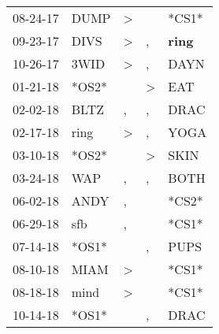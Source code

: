 \begin{supertabular}{p{0.07\textwidth}p{0.06\textwidth}p{0.02\textwidth}p{0.02\textwidth}p{0.06\textwidth}}
          08-24-17\textsuperscript{} &           DUMP\textsuperscript{} &     \textgreater &                  &                            *CS1* \\
          09-23-17\textsuperscript{} &           DIVS\textsuperscript{} &     \textgreater &                , &  \textbf{ring\textsuperscript{}} \\
          10-26-17\textsuperscript{} &           3WID\textsuperscript{} &     \textgreater &                , &           DAYN\textsuperscript{} \\
          01-21-18\textsuperscript{} &                            *OS2* &                  &     \textgreater &            EAT\textsuperscript{} \\
          02-02-18\textsuperscript{} &           BLTZ\textsuperscript{} &                , &                , &           DRAC\textsuperscript{} \\
          02-17-18\textsuperscript{} &           ring\textsuperscript{} &     \textgreater &                , &           YOGA\textsuperscript{} \\
          03-10-18\textsuperscript{} &                            *OS2* &                  &     \textgreater &           SKIN\textsuperscript{} \\
          03-24-18\textsuperscript{} &            WAP\textsuperscript{} &                , &                , &           BOTH\textsuperscript{} \\
          06-02-18\textsuperscript{} &           ANDY\textsuperscript{} &                , &                  &                            *CS2* \\
          06-29-18\textsuperscript{} &            sfb\textsuperscript{} &                , &                  &                            *CS1* \\
          07-14-18\textsuperscript{} &                            *OS1* &                  &                , &           PUPS\textsuperscript{} \\
          08-10-18\textsuperscript{} &           MIAM\textsuperscript{} &     \textgreater &                  &                            *CS1* \\
          08-18-18\textsuperscript{} &           mind\textsuperscript{} &     \textgreater &                  &                            *CS1* \\
          10-14-18\textsuperscript{} &                            *OS1* &                  &                , &           DRAC\textsuperscript{} \\

\end{supertabular}
